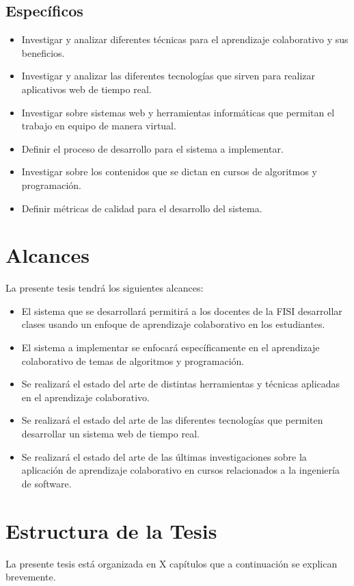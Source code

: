 \subsection{Específicos}
\begin{itemize}
  \item Investigar y analizar diferentes técnicas para el aprendizaje colaborativo y sus beneficios.
  \item Investigar y analizar las diferentes tecnologías que sirven para realizar aplicativos web de tiempo real.
  \item Investigar sobre sistemas web y herramientas informáticas que permitan el trabajo en equipo de manera virtual.
  \item Definir el proceso de desarrollo para el sistema a implementar.
  \item Investigar sobre los contenidos que se dictan en cursos de algoritmos y programación.
  \item Definir métricas de calidad para el desarrollo del sistema.
\end{itemize}

\section{Alcances}
La presente tesis tendrá los siguientes alcances:
\begin{itemize}
  \item El sistema que se desarrollará permitirá a los docentes de la FISI desarrollar clases usando un enfoque de aprendizaje colaborativo en los estudiantes.
  \item El sistema a implementar se enfocará específicamente en el aprendizaje  colaborativo de temas de algoritmos y programación.
  \item Se realizará el estado del arte de distintas herramientas y técnicas aplicadas en el aprendizaje colaborativo.
  \item Se realizará el estado del arte de las diferentes tecnologías que permiten desarrollar un sistema web de tiempo real.
  \item Se realizará el estado del arte de las últimas investigaciones sobre la aplicación de aprendizaje colaborativo en cursos relacionados a la ingeniería de software.
\end{itemize}

\section{Estructura de la Tesis}
La presente tesis está organizada en X capítulos que a continuación se explican brevemente.\\

